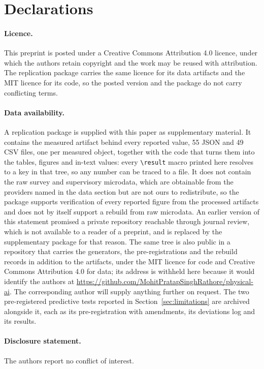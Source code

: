 \section*{Declarations}

\paragraph{Licence.} This preprint is posted under a Creative Commons Attribution 4.0
licence, under which the authors retain copyright and the work may be reused with
attribution. The replication package carries the same licence for its data artifacts and the
MIT licence for its code, so the posted version and the package do not carry conflicting
terms.

\paragraph{Data availability.} A replication package is supplied with this paper as
supplementary material. It contains the measured artifact behind every reported value, 55 JSON
and 49 CSV files, one per measured object, together with the code that turns them into the
tables, figures and in-text values: every \verb|\result| macro printed here resolves to a key
in that tree, so any number can be traced to a file. It does not contain the raw survey and
supervisory microdata, which are obtainable from the providers named in the data section but
are not ours to redistribute, so the package supports verification of every reported figure
from the processed artifacts and does not by itself support a rebuild from raw microdata. An
earlier version of this statement promised a private repository reachable through journal
review, which is not available to a reader of a preprint, and is replaced by the supplementary
package for that reason. The same tree is also public in a repository that carries the
generators, the pre-registrations and the rebuild records in addition to the artifacts, under
the MIT licence for code and Creative Commons Attribution 4.0 for data\ifanon; its address is
withheld here because it would identify the authors\else{} at
\url{https://github.com/MohitPratapSinghRathore/physical-ai}\fi. The corresponding author
will supply anything further on request. The two pre-registered predictive tests reported in
Section~\ref{sec:limitations} are archived alongside it, each as its pre-registration with
amendments, its deviations log and its results.

\ifanon
\else
\paragraph{Disclosure statement.} The authors report no conflict of interest.
